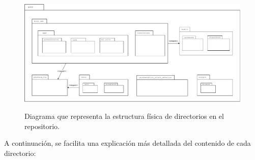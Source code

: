 \begin{figure}[h]
	\caption[Diagrama: estructura de directorios]{Diagrama que representa la estructura física de directorios en el repositorio.}
	\centering
	\includegraphics[width=\textwidth]{../img/anexos/diagrams/repo-structure}
	\label{d:diag-repo-structure}
\end{figure}

A continuación, se facilita una explicación más detallada del contenido de cada directorio:

